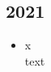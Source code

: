 
\subsection{2021}
\begin{history}

    \begin{itemize}

        \item x\\
              text

    \end{itemize}

\end{history}
